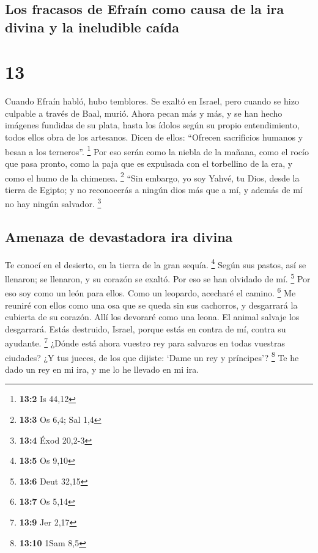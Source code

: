 \hypertarget{los-fracasos-de-efrauxedn-como-causa-de-la-ira-divina-y-la-ineludible-cauxedda}{%
\subsection{Los fracasos de Efraín como causa de la ira divina y la
ineludible
caída}\label{los-fracasos-de-efrauxedn-como-causa-de-la-ira-divina-y-la-ineludible-cauxedda}}

\hypertarget{section-12}{%
\section{13}\label{section-12}}

 Cuando Efraín habló, hubo temblores. Se exaltó en Israel,
pero cuando se hizo culpable a través de Baal, murió. 
Ahora pecan más y más, y se han hecho imágenes fundidas de su plata,
hasta los ídolos según su propio entendimiento, todos ellos obra de los
artesanos. Dicen de ellos: ``Ofrecen sacrificios humanos y besan a los
terneros''. \footnote{\textbf{13:2} Is 44,12}  Por eso
serán como la niebla de la mañana, como el rocío que pasa pronto, como
la paja que es expulsada con el torbellino de la era, y como el humo de
la chimenea. \footnote{\textbf{13:3} Os 6,4; Sal 1,4} 
``Sin embargo, yo soy Yahvé, tu Dios, desde la tierra de Egipto; y no
reconocerás a ningún dios más que a mí, y además de mí no hay ningún
salvador. \footnote{\textbf{13:4} Éxod 20,2-3}

\hypertarget{amenaza-de-devastadora-ira-divina}{%
\subsection{Amenaza de devastadora ira
divina}\label{amenaza-de-devastadora-ira-divina}}

 Te conocí en el desierto, en la tierra de la gran sequía.
\footnote{\textbf{13:5} Os 9,10}  Según sus pastos, así se
llenaron; se llenaron, y su corazón se exaltó. Por eso se han olvidado
de mí. \footnote{\textbf{13:6} Deut 32,15}  Por eso soy
como un león para ellos. Como un leopardo, acecharé el camino.
\footnote{\textbf{13:7} Os 5,14}  Me reuniré con ellos
como una osa que se queda sin sus cachorros, y desgarrará la cubierta de
su corazón. Allí los devoraré como una leona. El animal salvaje los
desgarrará.  Estás destruido, Israel, porque estás en
contra de mí, contra su ayudante. \footnote{\textbf{13:9} Jer 2,17}
 ¿Dónde está ahora vuestro rey para salvaros en todas
vuestras ciudades? ¿Y tus jueces, de los que dijiste: `Dame un rey y
príncipes'? \footnote{\textbf{13:10} 1Sam 8,5}  Te he
dado un rey en mi ira, y me lo he llevado en mi ira.

